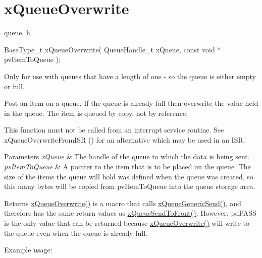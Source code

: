 \hypertarget{group__x_queue_overwrite}{}\section{x\+Queue\+Overwrite}
\label{group__x_queue_overwrite}
queue. h 
\begin{DoxyPre}
BaseType\_t xQueueOverwrite(
                           QueueHandle\_t xQueue,
                           const void * pvItemToQueue
                      );
\end{DoxyPre}


Only for use with queues that have a length of one -\/ so the queue is either empty or full.

Post an item on a queue. If the queue is already full then overwrite the value held in the queue. The item is queued by copy, not by reference.

This function must not be called from an interrupt service routine. See x\+Queue\+Overwrite\+From\+I\+SR () for an alternative which may be used in an I\+SR.


\begin{DoxyParams}{Parameters}
{\em x\+Queue} & The handle of the queue to which the data is being sent.\\
\hline
{\em pv\+Item\+To\+Queue} & A pointer to the item that is to be placed on the queue. The size of the items the queue will hold was defined when the queue was created, so this many bytes will be copied from pv\+Item\+To\+Queue into the queue storage area.\\
\hline
\end{DoxyParams}
\begin{DoxyReturn}{Returns}
\hyperlink{externals_2freertos_2include_2queue_8h_a8e9ced123b5a0e37a36d3bbdb2e56b4e}{x\+Queue\+Overwrite()} is a macro that calls \hyperlink{externals_2freertos_2include_2queue_8h_a7ce86d1026e0c3055a523935bf53c0b3}{x\+Queue\+Generic\+Send()}, and therefore has the same return values as \hyperlink{externals_2freertos_2include_2queue_8h_aa612fcc2b1ceee0200f34b942e300b41}{x\+Queue\+Send\+To\+Front()}. However, pd\+P\+A\+SS is the only value that can be returned because \hyperlink{externals_2freertos_2include_2queue_8h_a8e9ced123b5a0e37a36d3bbdb2e56b4e}{x\+Queue\+Overwrite()} will write to the queue even when the queue is already full.
\end{DoxyReturn}
Example usage\+: 
\begin{DoxyPre}\end{DoxyPre}



